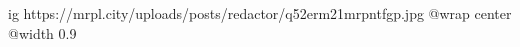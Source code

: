  
 
 
 
 

\ifcmt
  ig https://mrpl.city/uploads/posts/redactor/q52erm21mrpntfgp.jpg
  @wrap center
  @width 0.9
\fi
